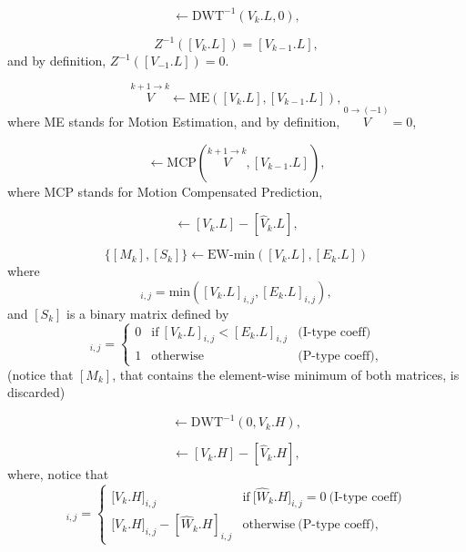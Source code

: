 \begin{equation}
  [V_k.L] \leftarrow \text{DWT}^{-1}(V_k.L, 0),
  \tag{E.a}
\end{equation}

\begin{equation}
  Z^{-1}([V_k.L]) = [V_{k-1}.L],
  \tag{E.b}
\end{equation}
and by definition, $Z^{-1}([V_{-1}.L]) = 0$.

\begin{equation}
  \overset{k+1\rightarrow k}{V} \leftarrow \text{ME}([V_k.L], [V_{k-1}.L]),
  \tag{E.c}
\end{equation}
where ME stands for Motion Estimation, and by definition,
$\overset{0\rightarrow (-1)}{V}=0$,

\begin{equation}
  [\hat{V}_k.L] \leftarrow \text{MCP}(\overset{k+1\rightarrow k}{V}, [V_{k-1}.L]),
  \tag{E.d}
\end{equation}
where MCP stands for Motion Compensated Prediction,

\begin{equation}
  [E_k.L] \leftarrow [V_k.L] - [\hat{V}_k.L],
  \tag{E.e}
\end{equation}

\begin{equation}
  \{[M_k],[S_k]\} \leftarrow \text{EW-min}([V_k.L], [E_k.L])
  \tag{E.f}
\end{equation}
where
\begin{equation}
  [M_k]_{i,j}=\text{min}([V_k.L]_{i,j}, [E_k.L]_{i,j}),
\end{equation}
and $[S_k]$ is a binary matrix defined by
\begin{equation}
  [S_k]_{i,j} = \left\{
  \begin{array}{lll}
    0 & \text{if}~[V_k.L]_{i,j} < [E_k.L]_{i,j} & \text{(I-type coeff)} \\
    1 & \text{otherwise}                      & \text{(P-type coeff)},
  \end{array}
  \right.
  \label{eq:matrix}
\end{equation}
(notice that $[M_k]$, that contains the element-wise minimum of both
matrices, is discarded)

\begin{equation}
  [V_k.H] \leftarrow \text{DWT}^{-1}(0, V_k.H),
  \tag{b}
\end{equation}

\begin{equation}
  [E_k.H] \leftarrow [V_k.H] - [\hat{V}_k.H],
  \tag{c}
\end{equation}
where, notice that
\begin{equation}
  [E_k.H]_{i,j} = \left\{
  \begin{array}{ll}
    {[}V_k.H{]}_{i,j}                       & \text{if}~{[}\hat{W}_k.H{]}_{i,j} = 0~\text{(I-type coeff)} \\
    {[}V_k.H{]}_{i,j} - [\hat{W}_k.H]_{i,j} & \text{otherwise}~\text{(P-type coeff)},
  \end{array}
\right.
\end{equation}

